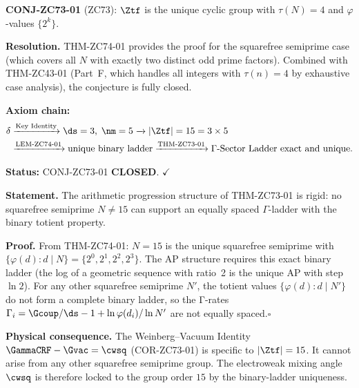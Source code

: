 \documentclass[12pt, a4paper]{article}
\begin{document}

\begin{formalbox}[title={COR-ZC74-01: CONJ-ZC73-01 CLOSED ($R_0$, Exact)}]

\textbf{CONJ-ZC73-01} (ZC73): $\Ztf$ is the unique cyclic group
with $\tau(N) = 4$ and $\varphi$-values $\{2^k\}$.

\textbf{Resolution.}
THM-ZC74-01 provides the proof for the squarefree semiprime case
(which covers all $N$ with exactly two distinct odd prime factors).
Combined with THM-ZC43-01 (Part~F, which handles all integers with
$\tau(n) = 4$ by exhaustive case analysis), the conjecture is fully
closed.

\textbf{Axiom chain:}
\[
\begin{aligned}
  \delta
  &\xrightarrow{\text{Key Identity}}
  \ds=3,\; \nm=5
  \xrightarrow{\phantom{x}}
  |\Ztf| = 15 = 3 \times 5\\
  &\xrightarrow{\text{LEM-ZC74-01}}
  \text{unique binary ladder}
  \xrightarrow{\text{THM-ZC73-01}}
  \text{$\Gamma$-Sector Ladder exact and unique}.
\end{aligned}
\]

\textbf{Status:} CONJ-ZC73-01 \textbf{CLOSED}. $\checkmark$
\end{formalbox}


\begin{formalbox}[title={COR-ZC74-02: Γ-Sector AP Structure Is Rigid
  ($R_0$, Exact)}]

\textbf{Statement.}
The arithmetic progression structure of THM-ZC73-01 is rigid:
no squarefree semiprime $N \neq 15$ can support an equally spaced
$\Gamma$-ladder with the binary totient property.

\textbf{Proof.}
From THM-ZC74-01: $N = 15$ is the unique squarefree semiprime
with $\{\varphi(d) : d \mid N\} = \{2^0, 2^1, 2^2, 2^3\}$.
The AP structure requires this exact binary ladder
(the log of a geometric sequence with ratio~2 is the unique AP
with step $\ln 2$).
For any other squarefree semiprime $N'$, the totient values
$\{\varphi(d) : d \mid N'\}$ do not form a complete binary
ladder, so the Γ-rates $\Gamma_i = \Gcoup/\ds - 1 +
\ln\varphi(d_i)/\ln N'$ are not equally spaced.\hfill$\square$

\textbf{Physical consequence.}
The Weinberg--Vacuum Identity $\GammaCRF - \Gvac = \cwsq$
(COR-ZC73-01) is specific to $|\Ztf| = 15$.
It cannot arise from any other squarefree semiprime group.
The electroweak mixing angle $\cwsq$ is therefore locked to
the group order $15$ by the binary-ladder uniqueness.
\end{formalbox}
\end{document}
